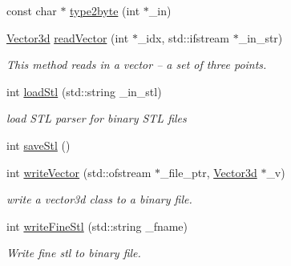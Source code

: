 \begin{DoxyCompactItemize}
const char $\ast$ \hyperlink{classkia_1_1Mesh_a6d56efa4776a899d6e1ceaac1065ed59}{type2byte} (int $\ast$\-\_\-in)
\item 
\hyperlink{classkia_1_1Vector3d}{Vector3d} \hyperlink{classkia_1_1Mesh_a4a621e0c24a37b01a409b600de97fef3}{read\-Vector} (int $\ast$\-\_\-idx, std\-::ifstream $\ast$\-\_\-in\-\_\-str)
\begin{DoxyCompactList}\small\item\em This method reads in a vector -- a set of three points. \end{DoxyCompactList}\item 
int \hyperlink{classkia_1_1Mesh_a0e34a0674447185ebfe5d81303bff72c}{load\-Stl} (std\-::string \-\_\-in\-\_\-stl)
\begin{DoxyCompactList}\small\item\em load S\-T\-L parser for binary S\-T\-L files \end{DoxyCompactList}\item 
int \hyperlink{classkia_1_1Mesh_abebca6455a4abe2e69193aa54712c465}{save\-Stl} ()
\item 
int \hyperlink{classkia_1_1Mesh_a9f6a1647811a6742ce58562238b7ae30}{write\-Vector} (std\-::ofstream $\ast$\-\_\-file\-\_\-ptr, \hyperlink{classkia_1_1Vector3d}{Vector3d} $\ast$\-\_\-v)
\begin{DoxyCompactList}\small\item\em write a vector3d class to a binary file. \end{DoxyCompactList}\item 
int \hyperlink{classkia_1_1Mesh_a5436fb8f87de62109826ec1fdbeda1bc}{write\-Fine\-Stl} (std\-::string \-\_\-fname)
\begin{DoxyCompactList}\small\item\em Write fine stl to binary file. \end{DoxyCompactList}\end{DoxyCompactItemize}
